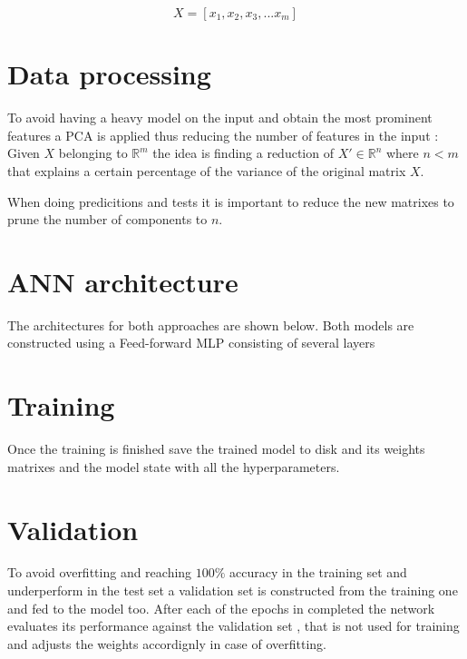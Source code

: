 $$X = [x_1, x_2, x_3, ... x_m]$$


\section{Data processing}
\label{data processing}

To avoid having a heavy model on the input and obtain the most prominent features a PCA is applied thus reducing the number of features in the input \cite{pca} \cite{Minka2001}: 
Given $X$ belonging to $\mathbb{R}^m$ the idea is finding a reduction of $ X' \in \mathbb{R}^n$ where $n < m$ that explains a certain percentage of the variance of the original matrix $X$.

When doing predicitions and tests it is important to reduce the new matrixes to prune the number of components to $n$. 


\section{ANN architecture}
The architectures for both approaches are shown below. 
Both models are constructed using a Feed-forward MLP consisting of several layers




\section{Training}
\label{training phase}

Once the training is finished save the trained model to disk and its weights matrixes and the model state with all the hyperparameters.

\section{Validation}
To avoid overfitting and reaching $100\%$ accuracy in the training set and underperform in the test set a validation set is constructed from the training one and fed to the model too.
After each of the epochs in completed the network evaluates its performance against the validation set , that is not used for training and adjusts the weights accordignly in case of overfitting.


